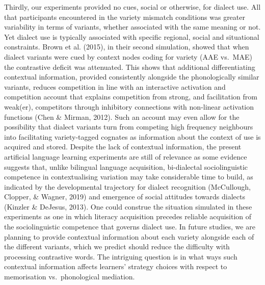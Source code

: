 \documentclass[doc,floatsintext]{apa6}
\begin{document}
Thirdly, our experiments provided no cues, social or otherwise, for
dialect use. All that participants encountered in the variety mismatch
conditions was greater variability in terms of variants, whether
associated with the same meaning or not. Yet dialect use is typically
associated with specific regional, social and situational constraints.
Brown et al. (2015), in their second simulation, showed that when
dialect variants were cued by context nodes coding for variety (AAE
vs.~MAE) the contrastive deficit was attenuated. This shows that
additional differentiating contextual information, provided consistently
alongside the phonologically similar variants, reduces competition in
line with an interactive activation and competition account that
explains competition from strong, and facilitation from weak(er),
competitors through inhibitory connections with non-linear activation
functions (Chen \& Mirman, 2012). Such an account may even allow for the
possibility that dialect variants turn from competing high frequency
neighbours into facilitating variety-tagged cognates as information
about the context of use is acquired and stored. Despite the lack of
contextual information, the present artificial language learning
experiments are still of relevance as some evidence suggests that,
unlike bilingual language acquisition, bi-dialectal sociolinguistic
competence in contextualising variation may take considerable time to
build, as indicated by the developmental trajectory for dialect
recognition (McCullough, Clopper, \& Wagner, 2019) and emergence of
social attitudes towards dialects (Kinzler \& DeJesus, 2013). One could
construe the situation simulated in these experiments as one in which
literacy acquisition precedes reliable acquisition of the
sociolinguistic competence that governs dialect use. In future studies,
we are planning to provide contextual information about each variety
alongside each of the different variants, which we predict should reduce
the difficulty with processing contrastive words. The intriguing
question is in what ways such contextual information affects learners'
strategy choices with respect to memorisation vs.~phonological
mediation.
\end{document}
